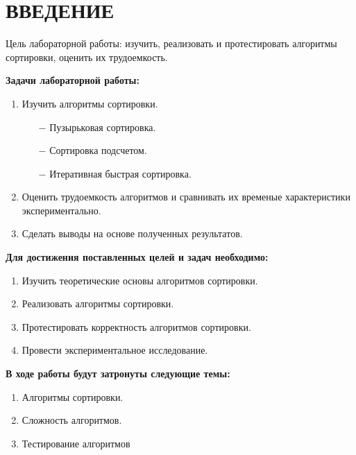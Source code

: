 \chapter*{ВВЕДЕНИЕ}

Цель лабораторной работы: изучить, реализовать и протестировать алгоритмы сортировки,
оценить их трудоемкость.\newline


\textbf{Задачи лабораторной работы:}
\begin{enumerate}
\item Изучить алгоритмы сортировки.
\begin{enumerate}
    \item[$-$] Пузырьковая сортировка.
    \item[$-$] Сортировка подсчетом.
    \item[$-$] Итеративная быстрая сортировка.
\end{enumerate}
\item Оценить трудоемкость алгоритмов и сравнивать их временые характеристики экспериментально.
\item Сделать выводы на основе полученных результатов.
\end{enumerate}

\textbf{Для достижения поставленных целей и задач необходимо:}
\begin{enumerate}
    \item Изучить теоретические основы алгоритмов сортировки.
    \item Реализовать алгоритмы сортировки.
    \item Протестировать корректность алгоритмов сортировки.
    \item Провести экспериментальное исследование.
\end{enumerate}

\textbf{В ходе работы будут затронуты следующие темы:}
\begin{enumerate}
\item Алгоритмы сортировки.
\item Сложность алгоритмов.
\item Тестирование алгоритмов
\end{enumerate}

